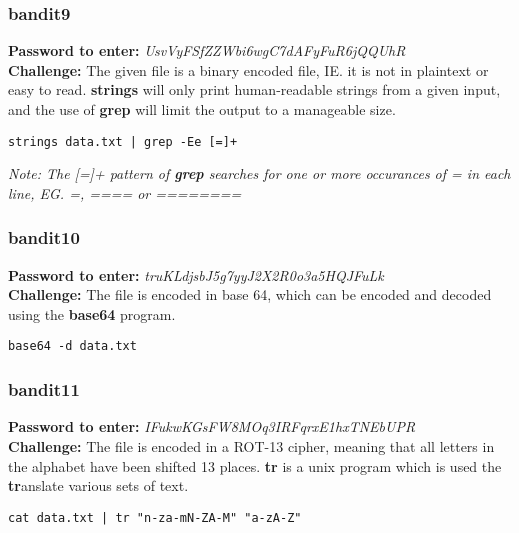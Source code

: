 \documentclass[a4paper]{article}
\newcommand{\pass}[1]{\textbf{Password to enter:} \textit{#1}\\}
\newcommand{\chall}{\textbf{Challenge:} }
\begin{document}
\subsubsection{bandit9}
\pass{UsvVyFSfZZWbi6wgC7dAFyFuR6jQQUhR}
\chall The given file is a binary encoded file, IE. it is not in plaintext or easy to read. \textbf{strings} will only print human-readable strings from a given input, and the use of \textbf{grep} will limit the output to a manageable size.
\begin{lstlisting}
strings data.txt | grep -Ee [=]+
\end{lstlisting}
\textit{Note: The [=]+ pattern of \textbf{grep} searches for one or more occurances of \textit{=} in each line, EG. \textit{=}, \textit{====} or \textit{========}}

\subsubsection{bandit10}
\pass{truKLdjsbJ5g7yyJ2X2R0o3a5HQJFuLk}
\chall The file is encoded in base 64, which can be encoded and decoded using the \textbf{base64} program.
\begin{lstlisting}
base64 -d data.txt
\end{lstlisting}

\subsubsection{bandit11}
\pass{IFukwKGsFW8MOq3IRFqrxE1hxTNEbUPR}
\chall The file is encoded in a ROT-13 cipher, meaning that all letters in the alphabet have been shifted 13 places. \textbf{tr} is a unix program which is used the \textbf{tr}anslate various sets of text.
\begin{lstlisting}
cat data.txt | tr "n-za-mN-ZA-M" "a-zA-Z"
\end{lstlisting}
\end{document}
